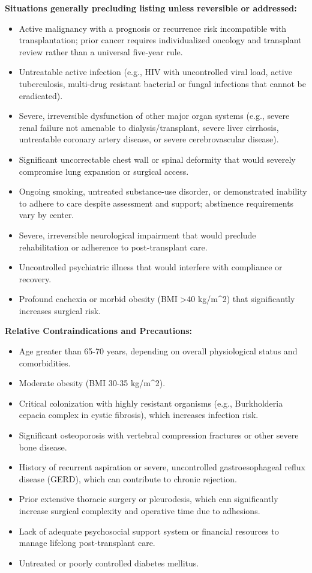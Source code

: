 \textbf{Situations generally precluding listing unless reversible or addressed:}
\begin{itemize}
  \item Active malignancy with a prognosis or recurrence risk incompatible with transplantation; prior cancer requires individualized oncology and transplant review rather than a universal five-year rule.
  \item Untreatable active infection (e.g., HIV with uncontrolled viral load, active tuberculosis, multi-drug resistant bacterial or fungal infections that cannot be eradicated).
  \item Severe, irreversible dysfunction of other major organ systems (e.g., severe renal failure not amenable to dialysis/transplant, severe liver cirrhosis, untreatable coronary artery disease, or severe cerebrovascular disease).
  \item Significant uncorrectable chest wall or spinal deformity that would severely compromise lung expansion or surgical access.
  \item Ongoing smoking, untreated substance-use disorder, or demonstrated inability to adhere to care despite assessment and support; abstinence requirements vary by center.
  \item Severe, irreversible neurological impairment that would preclude rehabilitation or adherence to post-transplant care.
  \item Uncontrolled psychiatric illness that would interfere with compliance or recovery.
  \item Profound cachexia or morbid obesity (BMI >40 kg/m\textasciicircum2) that significantly increases surgical risk.
\end{itemize}

\textbf{Relative Contraindications and Precautions:}
\begin{itemize}
  \item Age greater than 65-70 years, depending on overall physiological status and comorbidities.
  \item Moderate obesity (BMI 30-35 kg/m\textasciicircum2).
  \item Critical colonization with highly resistant organisms (e.g., Burkholderia cepacia complex in cystic fibrosis), which increases infection risk.
  \item Significant osteoporosis with vertebral compression fractures or other severe bone disease.
  \item History of recurrent aspiration or severe, uncontrolled gastroesophageal reflux disease (GERD), which can contribute to chronic rejection.
  \item Prior extensive thoracic surgery or pleurodesis, which can significantly increase surgical complexity and operative time due to adhesions.
  \item Lack of adequate psychosocial support system or financial resources to manage lifelong post-transplant care.
  \item Untreated or poorly controlled diabetes mellitus.
\end{itemize}

